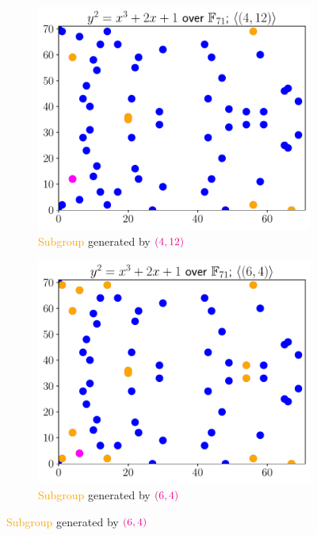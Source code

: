 \begin{figure}[p]
    \begin{subfigure}[t]{0.45\textwidth}
    \includegraphics[width=\textwidth]{plots/ec_finite/ec_finite_F_71_2_1_subgroup_4_12.pdf}
    \caption{\textcolor{orange}{Subgroup} generated by
        $\color{magenta}\left( 4,12 \right)$}
    \label{fig:ec_finite_plots_subgroups_4_12}
    \end{subfigure}
    \begin{subfigure}[t]{0.45\textwidth}
    \includegraphics[width=\textwidth]{plots/ec_finite/ec_finite_F_71_2_1_subgroup_6_4.pdf}
    \caption{\textcolor{orange}{Subgroup} generated by
        $\color{magenta}\left( 6,4 \right)$}
    \label{fig:ec_finite_plots_subgroups_6_4}
    \end{subfigure}


\end{figure}
